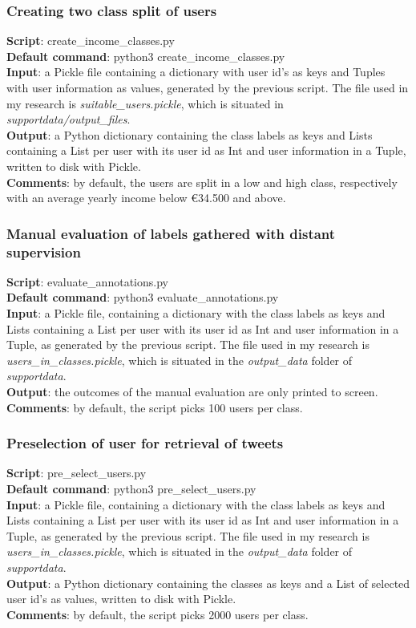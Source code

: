 \documentclass[
10pt, %
a4paper, %
oneside, %
headinclude,footinclude, %
] {book}%
\begin{document}
\subsubsection{Creating two class split of users}
\textbf{Script}:	create\_income\_classes.py \\
\textbf{Default command}: python3 create\_income\_classes.py\\
\textbf{Input}:  a Pickle file containing a dictionary with user id's as keys and Tuples with user information as values, generated by the previous script. The file used in my research is \textit{suitable\_users.pickle}, which is situated in \textit{supportdata/output\_files}. \\
\textbf{Output}:  a Python dictionary containing the class labels as keys and Lists containing a List per user with its
    user id as Int and user information in a Tuple, written to disk with Pickle.\\
\textbf{Comments}: by default, the users are split in a low and high class, respectively with an average yearly income below \euro 34.500 and above.

\subsubsection{Manual evaluation of labels gathered with distant supervision}
\textbf{Script}:	evaluate\_annotations.py \\
\textbf{Default command}: python3 evaluate\_annotations.py\\
\textbf{Input}:  a Pickle file, containing a dictionary with the class labels as keys and Lists containing a List per user with its
    user id as Int and user information in a Tuple, as generated by the previous script. The file used in my research is \textit{users\_in\_classes.pickle}, which is situated in the \textit{output\_data} folder of \textit{supportdata}. \\
\textbf{Output}:  the outcomes of the manual evaluation are only printed to screen. \\
\textbf{Comments}: by default, the script picks 100 users per class. 

\subsubsection{Preselection of user for retrieval of tweets}
\textbf{Script}:	pre\_select\_users.py \\
\textbf{Default command}: python3 pre\_select\_users.py\\
\textbf{Input}:  a Pickle file, containing a dictionary with the class labels as keys and Lists containing a List per user with its
    user id as Int and user information in a Tuple, as generated by the previous script. The file used in my research is \textit{users\_in\_classes.pickle}, which is situated in the \textit{output\_data} folder of \textit{supportdata}. \\
\textbf{Output}:  a Python dictionary containing the classes as keys and a List of selected user id's as values, written to disk with Pickle. \\
\textbf{Comments}: by default, the script picks 2000 users per class. 
\end{document}

